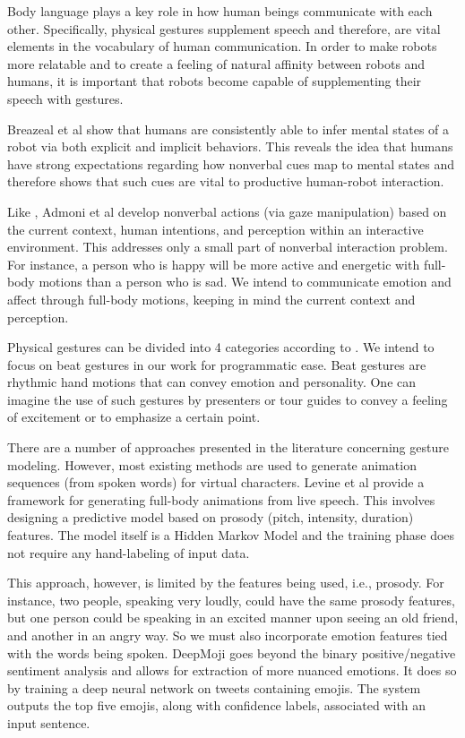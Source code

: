 Body language plays a key role in how human beings communicate with each other. Specifically, physical gestures supplement speech and therefore, are vital elements in the vocabulary of human communication. In order to make robots more relatable and to create a feeling of natural affinity between robots and humans, it is important that robots become capable of supplementing their speech with gestures.

Breazeal et al \cite{breazeal:8} show that humans are consistently able to infer mental states of a robot via both explicit and implicit behaviors. This reveals the idea that humans have strong expectations regarding how nonverbal cues map to mental states and therefore shows that such cues are vital to productive human-robot interaction.

Like \cite{breazeal:8}, Admoni et al \cite{admoni:7} develop nonverbal actions (via gaze manipulation) based on the current context, human intentions, and perception within an interactive environment. This addresses only a small part of nonverbal interaction problem. For instance, a person who is happy will be more active and energetic with full-body motions than a person who is sad. We intend to communicate emotion and affect through full-body motions, keeping in mind the current context and perception.

Physical gestures can be divided into 4 categories according to \cite{mcneill:levine}. We intend to focus on beat gestures in our work for programmatic ease. Beat gestures are rhythmic hand motions that can convey emotion and personality. One can imagine the use of such gestures by presenters or tour guides to convey a feeling of excitement or to emphasize a certain point.

There are a number of approaches presented in the literature concerning gesture modeling. However, most existing methods are used to generate animation sequences (from spoken words) for virtual characters. Levine et al \cite{levine:2} provide a framework for generating full-body animations from live speech. This involves designing a predictive model based on prosody (pitch, intensity, duration) features. The model itself is a Hidden Markov Model and the training phase does not require any hand-labeling of input data.

This approach, however, is limited by the features being used, i.e., prosody. For instance, two people, speaking very loudly, could have the same prosody features, but one person could be speaking in an excited manner upon seeing an old friend, and another in an angry way. So we must also incorporate emotion features tied with the words being spoken. DeepMoji \cite{deepmojipaper:3} goes beyond the binary positive/negative sentiment analysis and allows for extraction of more nuanced emotions. It does so by training a deep neural network on tweets containing emojis. The system outputs the top five emojis, along with confidence labels, associated with an input sentence.

